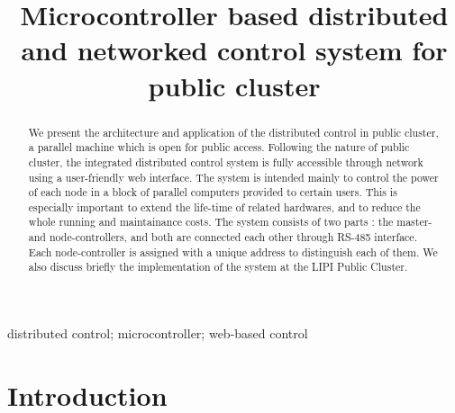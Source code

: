 \documentclass[conference,letterpaper]{IEEEtran}
\begin{document}
\title{Microcontroller based distributed and networked control system for public cluster}

\author{
}

\maketitle

\thispagestyle{fancy}
\fancyhead{}
\lhead{}
\cfoot{}
\rfoot{}
\renewcommand{\headrulewidth}{0pt}
\renewcommand{\footrulewidth}{0pt}

\begin{abstract}
We present the architecture and application of the distributed control in public cluster, a parallel machine which is open for public access. Following the nature of public cluster, the integrated distributed control system is fully accessible through network using a user-friendly web interface. The system is intended mainly to control the power of each node in a block of parallel computers provided to certain users. This  is especially important to extend the life-time of related hardwares, and to reduce the whole running and maintainance costs. The system consists of two parts : the master- and node-controllers, and both are connected each other through RS-485 interface. Each node-controller is assigned with a unique address to  distinguish each of them. We also discuss briefly the implementation of the system at the LIPI Public Cluster.
\end{abstract}

\begin{keywords}
distributed control; microcontroller; web-based control
\end{keywords}

\IEEEpeerreviewmaketitle


\section{Introduction}
\end{document}

